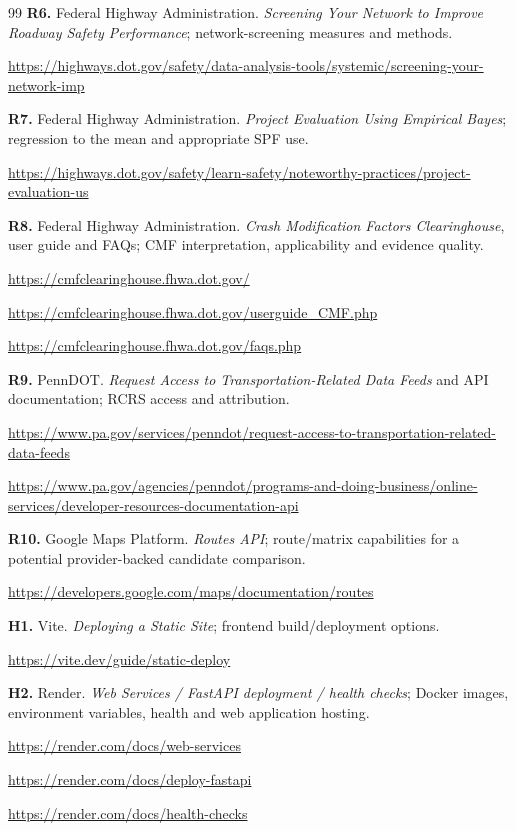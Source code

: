 \documentclass[11pt,a4paper,openany]{report}
\begin{document}
\begin{thebibliography}{99}
\textbf{R6.} Federal Highway Administration. \emph{Screening Your Network to Improve Roadway Safety Performance}; network-screening measures and methods.\par\url{https://highways.dot.gov/safety/data-analysis-tools/systemic/screening-your-network-imp}

\textbf{R7.} Federal Highway Administration. \emph{Project Evaluation Using Empirical Bayes}; regression to the mean and appropriate SPF use.\par\url{https://highways.dot.gov/safety/learn-safety/noteworthy-practices/project-evaluation-us}

\textbf{R8.} Federal Highway Administration. \emph{Crash Modification Factors Clearinghouse}, user guide and FAQs; CMF interpretation, applicability and evidence quality.\par\url{https://cmfclearinghouse.fhwa.dot.gov/}\par\url{https://cmfclearinghouse.fhwa.dot.gov/userguide_CMF.php}\par\url{https://cmfclearinghouse.fhwa.dot.gov/faqs.php}

\textbf{R9.} PennDOT. \emph{Request Access to Transportation-Related Data Feeds} and API documentation; RCRS access and attribution.\par\url{https://www.pa.gov/services/penndot/request-access-to-transportation-related-data-feeds}\par\url{https://www.pa.gov/agencies/penndot/programs-and-doing-business/online-services/developer-resources-documentation-api}

\textbf{R10.} Google Maps Platform. \emph{Routes API}; route/matrix capabilities for a potential provider-backed candidate comparison.\par\url{https://developers.google.com/maps/documentation/routes}

\textbf{H1.} Vite. \emph{Deploying a Static Site}; frontend build/deployment options.\par\url{https://vite.dev/guide/static-deploy}

\textbf{H2.} Render. \emph{Web Services / FastAPI deployment / health checks}; Docker images, environment variables, health and web application hosting.\par\url{https://render.com/docs/web-services}\par\url{https://render.com/docs/deploy-fastapi}\par\url{https://render.com/docs/health-checks}


\end{thebibliography}
\end{document}
